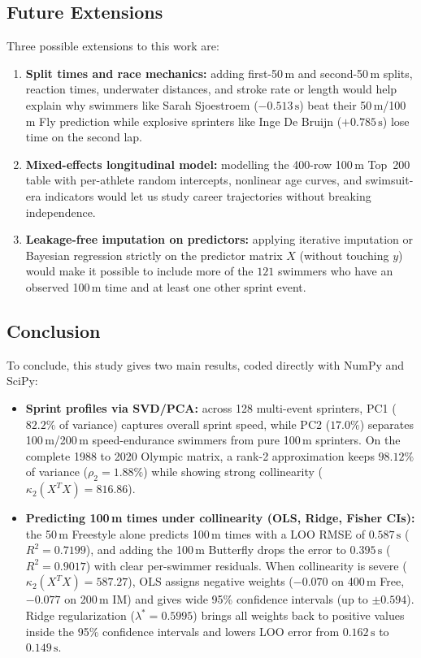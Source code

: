 \documentclass[11pt, a4paper]{article}
\begin{document}
\subsection{Future Extensions}

Three possible extensions to this work are:
\begin{enumerate}
    \item \textbf{Split times and race mechanics:} adding first-50\,m and second-50\,m splits, reaction times, underwater distances, and stroke rate or length would help explain why swimmers like Sarah Sjoestroem ($-0.513\,\text{s}$) beat their 50\,m/100\,m Fly prediction while explosive sprinters like Inge De Bruijn ($+0.785\,\text{s}$) lose time on the second lap.

    \item \textbf{Mixed-effects longitudinal model:} modelling the 400-row 100\,m Top~200 table with per-athlete random intercepts, nonlinear age curves, and swimsuit-era indicators would let us study career trajectories without breaking independence.

    \item \textbf{Leakage-free imputation on predictors:} applying iterative imputation or Bayesian regression strictly on the predictor matrix $X$ (without touching $y$) would make it possible to include more of the $121$ swimmers who have an observed 100\,m time and at least one other sprint event.
\end{enumerate}

\subsection{Conclusion}

To conclude, this study gives two main results, coded directly with NumPy and SciPy:
\begin{itemize}
    \item \textbf{Sprint profiles via SVD/PCA:} across 128 multi-event sprinters, PC1 ($82.2\%$ of variance) captures overall sprint speed, while PC2 ($17.0\%$) separates 100\,m/200\,m speed-endurance swimmers from pure 100\,m sprinters. On the complete 1988 to 2020 Olympic matrix, a rank-2 approximation keeps $98.12\%$ of variance ($\rho_2 = 1.88\%$) while showing strong collinearity ($\kappa_2(X^T X) = 816.86$).

    \item \textbf{Predicting 100\,m times under collinearity (OLS, Ridge, Fisher CIs):} the 50\,m Freestyle alone predicts 100\,m times with a LOO RMSE of $0.587\,\text{s}$ ($R^2 = 0.7199$), and adding the 100\,m Butterfly drops the error to $0.395\,\text{s}$ ($R^2 = 0.9017$) with clear per-swimmer residuals. When collinearity is severe ($\kappa_2(X^T X) = 587.27$), OLS assigns negative weights ($-0.070$ on 400\,m Free, $-0.077$ on 200\,m IM) and gives wide 95\% confidence intervals (up to $\pm 0.594$). Ridge regularization ($\lambda^* = 0.5995$) brings all weights back to positive values inside the 95\% confidence intervals and lowers LOO error from $0.162\,\text{s}$ to $0.149\,\text{s}$.
\end{itemize}
\end{document}
